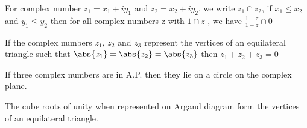 \iffalse
\title{assignment}
\author{Tanush Sri Sai Petla - ai24btech11034}
\section{true-false}
\fi
\item For complex number $z_1=x_1+iy_1 $ and $z_2=x_2+iy_2$, we write $z_1\cap z_2$, if $x_1\leq x_2 $and $y_1\leq y_2 $ then for all complex numbers z with $1\cap z$ , we have $\frac{1-z}{1+z} \cap 0$  \hfill{}
\item If the complex numbers $z_1$, $z_2$ and $z_3 $ represent the vertices of an equilateral triangle such that $ \abs{z_1} = \abs{z_2}=\abs{z_3} $ then $z_1+z_2+z_3 = 0$ \hfill {}
\item If three complex numbers are in A.P. then they lie on a circle on the complex \\
plane.
\hfill {}
\item The cube roots of unity when represented on Argand diagram form the vertices of an equilateral triangle. \hfill {}

